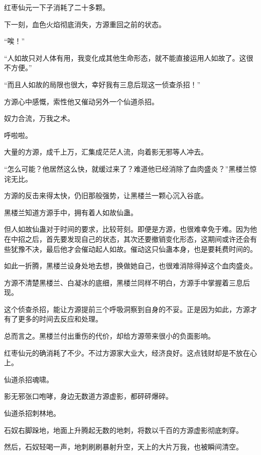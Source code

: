 
\begin{this_body}



红枣仙元一下子消耗了二十多颗。

下一刻，血色火焰彻底消失，方源重回之前的状态。

“唉！”

“人如故只对人体有用，我变化成其他生命形态，就不能直接运用人如故了。这很不方便。”

“而且人如故的局限也很大，幸好我有三息后现这一侦查杀招！”

方源心中感慨，索性他又催动另外一个仙道杀招。

奴力合流，万我之术。

呼啦啦。

大量的方源，成千上万，汇集成茫茫人流，向着影无邪等人冲去。

“怎么可能？他居然这么快，就缓过来了？难道他已经消除了血肉盛炎？”黑楼兰惊诧无比。

方源的反击来得太快，仍旧那般强势，让黑楼兰一颗心沉入谷底。

黑楼兰知道方源手中，拥有着人如故仙蛊。

但人如故仙蛊对于时间的要求，比较苛刻。即便是方源，也很难幸免于难。因为他在中招之后，首先要发现自己的状态，其次还要撤销变化形态，这期间或许还会有些犹豫不决，最后他才会催动起人如故。催动这只仙蛊本身，也是要耗费时间的。

如此一折腾，黑楼兰设身处地去想，换做她自己，也很难消除得掉这个血肉盛炎。

方源不清楚黑楼兰、白凝冰的底细，黑楼兰同样不明白，方源手中掌握着三息后现。

这个侦查杀招，能让方源提前三个呼吸洞察到自身的不妥。正是因为如此，方源才有了更多的时间去反应和处理。

总而言之。黑楼兰付出重伤的代价，却给方源带来很小的负面影响。

红枣仙元的确消耗了不少。不过方源家大业大，经济良好。这点钱财却是不放在心上。

仙道杀招魂啸。

影无邪张口咆哮，身边无数道方源虚影，都砰砰爆碎。

仙道杀招刺林地。

石奴右脚跺地，地面上升腾起无数的地刺，将数以千百的方源虚影彻底刺穿。

然后，石奴轻喝一声，地刺刷刷暴射升空，天上的大片万我，也被瞬间清空。


\end{this_body}

